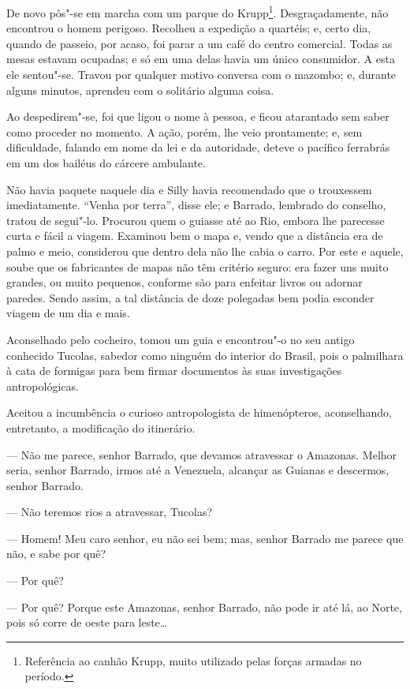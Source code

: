 De novo pôs"-se em marcha com um parque do Krupp\footnote{Referência ao
  canhão Krupp, muito utilizado pelas forças armadas no período.}.
Desgraçadamente, não encontrou o homem perigoso. Recolheu a expedição a
quartéis; e, certo dia, quando de passeio, por acaso, foi parar a um
café do centro comercial. Todas as mesas estavam ocupadas; e só em uma
delas havia um único consumidor. A esta ele sentou"-se. Travou por
qualquer motivo conversa com o mazombo; e, durante alguns minutos,
aprendeu com o solitário alguma coisa.

Ao despedirem"-se, foi que ligou o nome à pessoa, e ficou atarantado sem
saber como proceder no momento. A ação, porém, lhe veio prontamente; e,
sem dificuldade, falando em nome da lei e da autoridade, deteve o
pacífico ferrabrás em um dos bailéus do cárcere ambulante.

Não havia paquete naquele dia e Silly havia recomendado que o trouxessem
imediatamente. ``Venha por terra'', disse ele; e Barrado, lembrado do
conselho, tratou de segui"-lo. Procurou quem o guiasse até ao Rio, embora
lhe parecesse curta e fácil a viagem. Examinou bem o mapa e, vendo que a
distância era de palmo e meio, considerou que dentro dela não lhe cabia
o carro. Por este e aquele, soube que os fabricantes de mapas não têm
critério seguro: era fazer uns muito grandes, ou muito pequenos,
conforme são para enfeitar livros ou adornar paredes. Sendo assim, a tal
distância de doze polegadas bem podia esconder viagem de um dia e mais.

Aconselhado pelo cocheiro, tomou um guia e encontrou"-o no seu antigo
conhecido Tucolas, sabedor como ninguém do interior do Brasil, pois o
palmilhara à cata de formigas para bem firmar documentos às suas
investigações antropológicas.

Aceitou a incumbência o curioso antropologista de himenópteros,
aconselhando, entretanto, a modificação do itinerário.

--- Não me parece, senhor Barrado, que devamos atravessar o Amazonas.
Melhor seria, senhor Barrado, irmos até a Venezuela, alcançar as Guianas
e descermos, senhor Barrado.

--- Não teremos rios a atravessar, Tucolas?

--- Homem! Meu caro senhor, eu não sei bem; mas, senhor Barrado me
parece que não, e sabe por quê?

--- Por quê?

--- Por quê? Porque este Amazonas, senhor Barrado, não pode ir até lá,
ao Norte, pois só corre de oeste para leste\ldots{}

